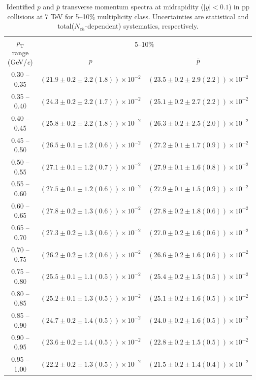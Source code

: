 \begin{table}
\caption{Identified $p$ and $\bar{p}$  transverse momentum spectra at midrapidity ($|y|<0.1$) in pp collisions at 7 TeV for 5--10\% multiplicity class. Uncertainties are statistical and total($N_{ch}$-dependent) systematics, respectively.}
\label{tab:ProtonPlus_ProtonMinus_5to10}
\begin{center}
\begin{tabular}{ c | c c }
\hline
\multirow{2}{*}{$p_{\mathrm{T}}$ range (GeV/\textit{c})} & \multicolumn{2}{c}{5--10\%} \\ & $p$& $\bar{p}$\\ 
\hline
0.30 -- 0.35 & $(21.9\pm0.2\pm2.2(1.8))\times10^{-2}$ & $(23.5\pm0.2\pm2.9(2.2))\times10^{-2}$ \\ 
0.35 -- 0.40 & $(24.3\pm0.2\pm2.2(1.7))\times10^{-2}$ & $(25.1\pm0.2\pm2.7(2.2))\times10^{-2}$ \\ 
0.40 -- 0.45 & $(25.8\pm0.2\pm2.2(1.8))\times10^{-2}$ & $(26.3\pm0.2\pm2.5(2.0))\times10^{-2}$ \\ 
0.45 -- 0.50 & $(26.5\pm0.1\pm1.2(0.6))\times10^{-2}$ & $(27.2\pm0.1\pm1.7(0.9))\times10^{-2}$ \\ 
0.50 -- 0.55 & $(27.1\pm0.1\pm1.2(0.7))\times10^{-2}$ & $(27.9\pm0.1\pm1.6(0.8))\times10^{-2}$ \\ 
0.55 -- 0.60 & $(27.5\pm0.1\pm1.2(0.6))\times10^{-2}$ & $(27.9\pm0.1\pm1.5(0.9))\times10^{-2}$ \\ 
0.60 -- 0.65 & $(27.8\pm0.2\pm1.3(0.6))\times10^{-2}$ & $(27.8\pm0.2\pm1.8(0.6))\times10^{-2}$ \\ 
0.65 -- 0.70 & $(27.3\pm0.2\pm1.3(0.6))\times10^{-2}$ & $(27.0\pm0.2\pm1.6(0.6))\times10^{-2}$ \\ 
0.70 -- 0.75 & $(26.2\pm0.2\pm1.2(0.6))\times10^{-2}$ & $(26.6\pm0.2\pm1.6(0.6))\times10^{-2}$ \\ 
0.75 -- 0.80 & $(25.5\pm0.1\pm1.1(0.5))\times10^{-2}$ & $(25.4\pm0.2\pm1.5(0.5))\times10^{-2}$ \\ 
0.80 -- 0.85 & $(25.2\pm0.1\pm1.3(0.5))\times10^{-2}$ & $(25.1\pm0.2\pm1.6(0.5))\times10^{-2}$ \\ 
0.85 -- 0.90 & $(24.7\pm0.2\pm1.4(0.5))\times10^{-2}$ & $(24.0\pm0.2\pm1.6(0.5))\times10^{-2}$ \\ 
0.90 -- 0.95 & $(23.6\pm0.2\pm1.4(0.5))\times10^{-2}$ & $(22.8\pm0.2\pm1.5(0.5))\times10^{-2}$ \\ 
0.95 -- 1.00 & $(22.2\pm0.2\pm1.3(0.5))\times10^{-2}$ & $(21.5\pm0.2\pm1.4(0.4))\times10^{-2}$ \\ 

\end{tabular}
\end{center}
\end{table}
